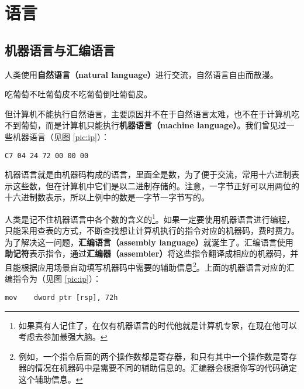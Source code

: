 
\section{语言}

\subsection{机器语言与汇编语言}

人类使用\textbf{自然语言（natural language）}进行交流，自然语言自由而散漫。

\begin{center}
	吃葡萄不吐葡萄皮不吃葡萄倒吐葡萄皮。
\end{center}

但计算机不能执行自然语言，主要原因并不在于自然语言太难，也不在于计算机吃不到葡萄，而是计算机只能执行\textbf{机器语言（machine language）}。我们曾见过一些机器语言（见图 \ref{pic:ip}）：

\begin{lstlisting}[language={}, numbers=none]
C7 04 24 72 00 00 00
\end{lstlisting}

\begin{note}
	机器语言就是由机器码构成的语言，里面全是数，为了便于交流，常用十六进制表示这些数，但在计算机中它们是以二进制存储的。注意，一字节正好可以用两位的十六进制数表示，所以上例中的数是一字节一字节写的。
\end{note}

人类是记不住机器语言中各个数的含义的\footnote{如果真有人记住了，在仅有机器语言的时代他就是计算机专家，在现在他可以考虑去参加最强大脑。}。如果一定要使用机器语言进行编程，只能采用查表的方式，不断查找想让计算机执行的指令对应的机器码，费时费力。为了解决这一问题，\textbf{汇编语言（assembly language）}就诞生了。汇编语言使用\textbf{助记符}表示指令，通过\textbf{汇编器（assembler）}将这些指令翻译成相应的机器码，并且能根据应用场景自动填写机器码中需要的辅助信息\footnote{例如，一个指令后面的两个操作数都是寄存器，和只有其中一个操作数是寄存器的情况在机器码中是需要不同的辅助信息的。汇编器会根据你写的代码确定这个辅助信息。}。上面的机器语言对应的汇编指令为（见图 \ref{pic:ip}）：

\begin{lstlisting}[language=assembly, numbers=none]
mov    dword ptr [rsp], 72h
\end{lstlisting}

